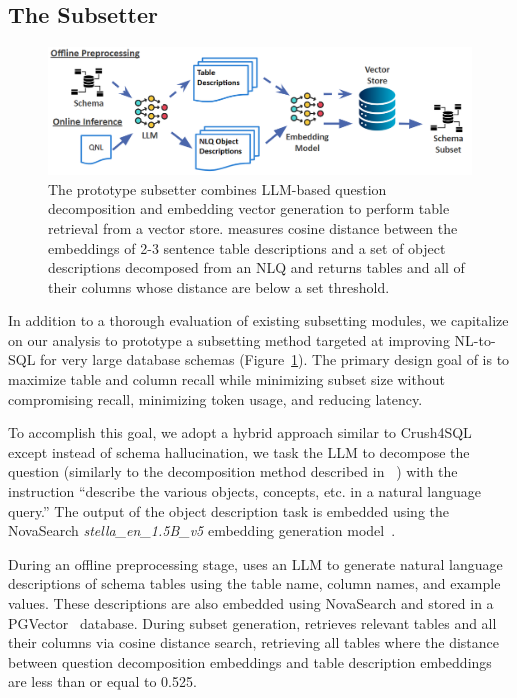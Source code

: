 \subsection{The \PROJECTNAME{ }Subsetter}

\begin{figure}
  \centering
  \includegraphics[width=\linewidth]{figures/skalpel-diagram.png}
  \caption{The prototype \PROJECTNAME{ }subsetter combines LLM-based question decomposition and embedding vector generation to perform table retrieval from a vector store. \PROJECTNAME{ } measures cosine distance between the embeddings of 2-3 sentence table descriptions and a set of object descriptions decomposed from an NLQ and returns tables and all of their columns whose distance are below a set threshold.}
  \label{fig:skalpelarchitecture}
\end{figure}

In addition to a thorough evaluation of existing subsetting modules, we capitalize on our analysis to prototype a subsetting method targeted at improving NL-to-SQL for very large database schemas (Figure~\ref{fig:skalpelarchitecture}).
The primary design goal of \PROJECTNAME{ }is to maximize table and column recall while minimizing subset size without compromising recall, minimizing token usage, and reducing latency.

To accomplish this goal, we adopt a hybrid approach similar to Crush4SQL~\cite{kothyari-etal-2023-crush4sql} except instead of schema hallucination, we task the LLM to decompose the question (similarly to the decomposition method described in ~\cite{Katsogiannis-Meimarakis2026}) with the instruction ``describe the various objects, concepts, etc. in a natural language query.''
The output of the object description task is embedded using the NovaSearch \emph{stella\_en\_1.5B\_v5} embedding generation model~\cite{zhang2025jasperstelladistillationsota}.

During an offline preprocessing stage, \PROJECTNAME{ }uses an LLM to generate natural language descriptions of schema tables using the table name, column names, and example values.
These descriptions are also embedded using NovaSearch and stored in a PGVector~\cite{pgvectorrepo} database.
During subset generation, \PROJECTNAME{ }retrieves relevant tables and all their columns via cosine distance search, retrieving all tables where the distance between question decomposition embeddings and table description embeddings are less than or equal to 0.525.


